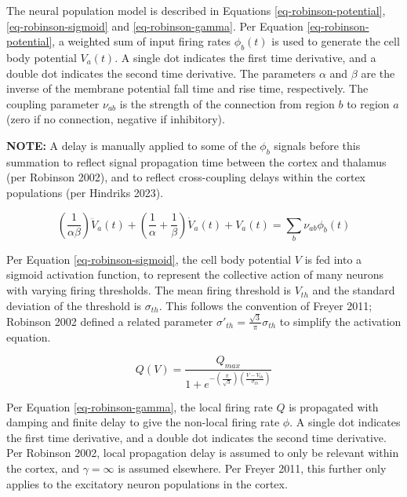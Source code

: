 The neural population model is described in Equations
\ref{eq-robinson-potential}, \ref{eq-robinson-sigmoid} and
\ref{eq-robinson-gamma}.
%
Per Equation \ref{eq-robinson-potential}, a weighted sum of input firing
rates $\phi_b(t)$ is used to generate the cell body potential $V_a(t)$. A
single dot indicates the first time derivative, and a double dot indicates
the second time derivative. The parameters $\alpha$ and $\beta$ are the
inverse of the membrane potential fall time and rise time, respectively.
The coupling parameter $\nu_{ab}$ is the strength of the connection from
region $b$ to region $a$ (zero if no connection, negative if inhibitory).

\textbf{NOTE:} A delay is manually applied to some of the $\phi_b$ signals
before this summation to reflect signal propagation time between the cortex
and thalamus (per Robinson 2002), and to reflect cross-coupling delays
within the cortex populations (per Hindriks 2023).

\begin{equation}
\left ( \frac{1}{\alpha \beta} \right ) \ddot{V}_a(t)
+ \left ( \frac{1}{\alpha} + \frac{1}{\beta} \right ) \dot{V}_a(t)
+ V_a(t) = \sum_b \nu_{ab} \phi_b(t)
\label{eq-robinson-potential}
\end{equation}

Per Equation \ref{eq-robinson-sigmoid}, the cell body potential $V$ is fed
into a sigmoid activation function, to represent the collective action of
many neurons with varying firing thresholds. The mean firing threshold is
$V_{th}$ and the standard deviation of the threshold is $\sigma_{th}$.
This follows the convention of Freyer 2011; Robinson 2002 defined a
related parameter $\sigma'_{th} = \frac{\sqrt{3}}{\pi} \sigma_{th}$ to
simplify the activation equation.

\begin{equation}
Q(V) = \frac{Q_{max}}
{1 + e^{- \left ( \frac{\pi}{\sqrt{3}} \right )
\left ( \frac{ V - V_{th}}{\sigma_{th}} \right )}}
\label{eq-robinson-sigmoid}
\end{equation}

Per Equation \ref{eq-robinson-gamma}, the local firing rate $Q$ is
propagated with damping and finite delay to give the non-local firing rate
$\phi$. A single dot indicates the first time derivative, and a double dot
indicates the second time derivative. Per Robinson 2002, local propagation
delay is assumed to only be relevant within the cortex, and
$\gamma = \infty$ is assumed elsewhere. Per Freyer 2011, this further only
applies to the excitatory neuron populations in the cortex.

